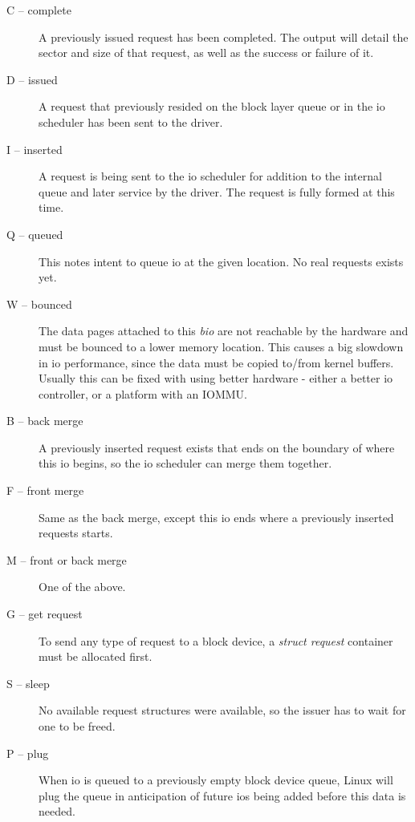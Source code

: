 \documentclass{article}
\begin{document}
\begin{description}
  \item[C -- complete] A previously issued request has been completed.
  The output will detail the sector and size of that request, as well
  as the success or failure of it.

  \item[D -- issued] A request that previously resided on the block layer
  queue or in the io scheduler has been sent to the driver.

  \item[I -- inserted] A request is being sent to the io scheduler for
  addition to the internal queue and later service by the driver. The
  request is fully formed at this time.

  \item[Q -- queued] This notes intent to queue io at the given location.
  No real requests exists yet.

  \item[W -- bounced] The data pages attached to this \emph{bio} are
  not reachable by the hardware and must be bounced to a lower memory
  location. This causes a big slowdown in io performance, since the data
  must be copied to/from kernel buffers. Usually this can be fixed with
  using better hardware - either a better io controller, or a platform
  with an IOMMU.

  \item[B -- back merge] A previously inserted request exists that ends
  on the boundary of where this io begins, so the io scheduler can merge
  them together.

  \item[F -- front merge] Same as the back merge, except this io ends
  where a previously inserted requests starts.

  \item[M -- front or back merge] One of the above.

  \item[G -- get request] To send any type of request to a block device,
  a \emph{struct request} container must be allocated first.

  \item[S -- sleep] No available request structures were available, so
  the issuer has to wait for one to be freed.

  \item[P -- plug] When io is queued to a previously empty block device
  queue, Linux will plug the queue in anticipation of future ios being
  added before this data is needed.


\end{description}
\end{document}
